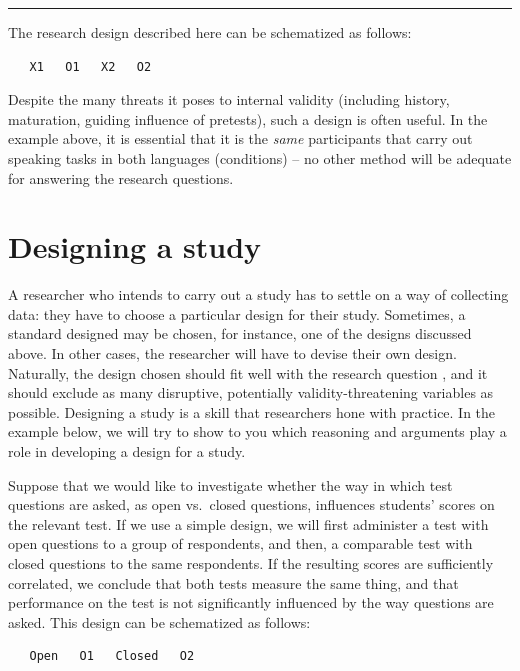 \documentclass[
]{book}
\begin{document}
\begin{center}\rule{0.5\linewidth}{0.5pt}\end{center}

The research design described here can be schematized as follows:

\begin{verbatim}
   X1   O1   X2   O2
\end{verbatim}

Despite the many threats it poses to internal validity (including history, maturation, guiding influence of pretests), such a design is often useful. In the example above, it is essential that it is the \emph{same} participants that carry out speaking tasks in both languages (conditions) -- no other method will be adequate for answering the research questions.

\hypertarget{designing-a-study}{%
\section{Designing a study}\label{designing-a-study}}

A researcher who intends to carry out a study has to settle on a way of collecting data: they have to choose a particular design for their study. Sometimes, a standard designed may be chosen, for instance, one of the designs discussed above. In other cases, the researcher will have to devise their own design. Naturally, the design chosen should fit well with the research question \citep{Levin99}, and it should exclude as many disruptive, potentially validity-threatening variables as possible. Designing a study is a skill that researchers hone with practice. In the example below, we will try to show to you which reasoning and arguments play a role in developing a design for a study.

Suppose that we would like to investigate whether the way in which test questions are asked, as open vs.~closed questions, influences students' scores on the relevant test. If we use a simple design, we will first administer a test with open questions to a group of respondents, and then, a comparable test with closed questions to the same respondents. If the resulting scores are sufficiently correlated, we conclude that both tests measure the same thing, and that performance on the test is not significantly influenced by the way questions are asked. This design can be schematized as follows:

\begin{verbatim}
   Open   O1   Closed   O2
\end{verbatim}
\end{document}
